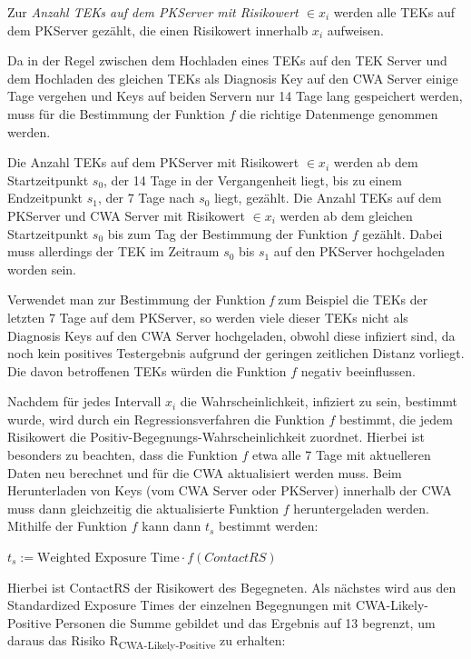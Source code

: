 \documentclass[conference,compsoc]{IEEEtran}
\begin{document}
Zur \textit{Anzahl TEKs auf dem PKServer mit Risikowert $\in x_i$} werden alle TEKs auf dem PKServer gezählt, die einen Risikowert innerhalb $x_i$ aufweisen.

Da in der Regel zwischen dem Hochladen eines TEKs auf den TEK Server und dem Hochladen des gleichen TEKs als Diagnosis Key auf den CWA Server einige Tage vergehen und 
Keys auf beiden Servern nur 14 Tage lang gespeichert werden, muss für die Bestimmung der Funktion $f$ die richtige Datenmenge genommen werden.

Die Anzahl TEKs auf dem PKServer mit Risikowert $\in x_i$ werden ab dem Startzeitpunkt $s_0$, der 14 Tage in der Vergangenheit liegt, bis zu einem Endzeitpunkt $s_1$, 
der 7 Tage nach $s_0$ liegt, gezählt. 
Die Anzahl TEKs auf dem PKServer und CWA Server mit Risikowert $\in x_i$ werden ab dem gleichen Startzeitpunkt $s_0$ bis zum Tag der Bestimmung der Funktion $f$ gezählt.
Dabei muss allerdings der TEK im Zeitraum $s_0$ bis $s_1$ auf den PKServer hochgeladen worden sein. 

Verwendet man zur Bestimmung der Funktion \textit{f} zum Beispiel die TEKs der letzten 7 Tage auf dem PKServer, 
so werden viele dieser TEKs nicht als Diagnosis Keys auf den CWA Server hochgeladen, 
obwohl diese infiziert sind, da noch kein positives Testergebnis aufgrund der geringen zeitlichen Distanz vorliegt. 
Die davon betroffenen TEKs würden die Funktion $f$ negativ beeinflussen.

Nachdem für jedes Intervall $x_i$ die Wahrscheinlichkeit, infiziert zu sein, bestimmt wurde, wird durch ein Regressionsverfahren die Funktion $f$ bestimmt, 
die jedem Risikowert die Positiv-Begegnungs-Wahrscheinlichkeit zuordnet. Hierbei ist besonders zu beachten, 
dass die Funktion $f$ etwa alle 7 Tage mit aktuelleren Daten neu berechnet und für die CWA aktualisiert werden muss. 
Beim Herunterladen von Keys (vom CWA Server oder PKServer) innerhalb der CWA muss dann gleichzeitig die aktualisierte Funktion $f$ heruntergeladen werden. 
Mithilfe der Funktion $f$ kann dann $t_s$ bestimmt werden: 

\centerline{\text{ }}
\centerline{$t_s := \text{Weighted Exposure Time} \cdot f(ContactRS)$}
\centerline{\text{ }}

Hierbei ist ContactRS der Risikowert des Begegneten.
Als nächstes wird aus den Standardized Exposure Times der einzelnen Begegnungen mit CWA-Likely-Positive Personen die Summe gebildet und das Ergebnis auf 13 begrenzt, 
um daraus das Risiko R\textsubscript{CWA-Likely-Positive} zu erhalten:
\end{document}
